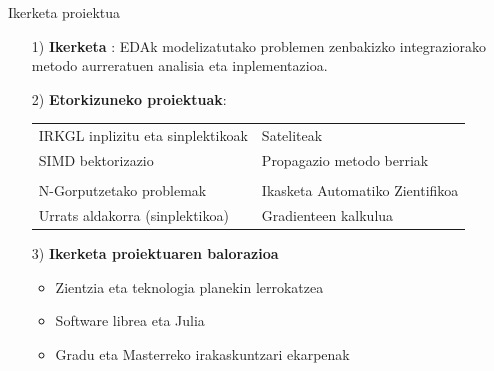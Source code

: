 \documentclass[
 10pt,%
 compress,%
 t,       %
 xcolor=svgnames
]{beamer}
\newcommand{\Laburpena}[2]{
	\begin{tcolorbox}[colback=blue!5!white,colframe=blue,title={Laburpena: #1}]
		#2
	\end{tcolorbox}
}
\theoremstyle{definition} \newtheorem{definicion}{Definicion}[section]
\theoremstyle{propiedades} \newtheorem{propiedades}{Propiedades}[section]
\begin{document}

\begin{frame}{Ikerketa proiektua} 	
	
\medskip
\small
	

\Laburpena{Ikerketa proiektua}
{

\begin{itemize}
	
	\item[1)] \textbf{Ikerketa }: EDAk modelizatutako problemen zenbakizko integraziorako metodo aurreratuen analisia eta inplementazioa.
	
	
	\medskip
	
	\item[2)] \textbf{Etorkizuneko proiektuak}:
	\begin{table}[h!]     
	\centering
	{%
		\begin{tabular}{ l l} 
			\color{ blue} IRKGL inplizitu eta sinplektikoak      &   \color{ blue}  Sateliteak \\ 
			SIMD bektorizazio &  Propagazio metodo berriak \\ \\
			
			
			\color{ blue} N-Gorputzetako problemak &   \color{ blue} Ikasketa Automatiko Zientifikoa \\ 
			Urrats aldakorra (sinplektikoa) &  Gradienteen kalkulua
	\end{tabular}}
\end{table}
	
	
	
	\item[3)] \textbf{Ikerketa proiektuaren balorazioa} 
	
	\begin{itemize}
		\item Zientzia eta teknologia planekin lerrokatzea
		\item Software librea eta Julia %
		\item Gradu eta Masterreko irakaskuntzari ekarpenak
	\end{itemize}
	
\end{itemize}

}
\end{frame}
\end{document}
